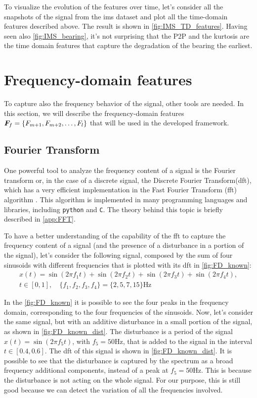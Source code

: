 To visualize the evolution of the features over time, let's consider all the snapshots of the  signal from the \gls{ims} dataset and plot all the time-domain features described above. The result is shown in \autoref{fig:IMS_TD_features}. Having seen also \autoref{fig:IMS_bearing}, it's not surprising that the P2P and the kurtosis are the time domain features that capture the degradation of the bearing the earliest. 


\section{Frequency-domain features}

To capture also the frequency behavior of the signal, other tools are needed. In this section, we will describe the frequency-domain features  $\bm{F}_f = \{F_{m+1}, F_{m+2}, \dots, F_l\}$ that will be used in the developed framework.

\subsection{Fourier Transform}
\label{sec:FFT}

One powerful tool to analyze the frequency content of a signal is the Fourier transform or, in the case of a discrete signal, the Discrete Fourier Transform(\gls{dft}), which has a very efficient implementation in the Fast Fourier Transform (\gls{fft}) algorithm \cite{cooley1965algorithm}. This algorithm is implemented in many programming languages and libraries, including \texttt{python} and \texttt{C}. The theory behind this topic is briefly described in \autoref{app:FFT}. 

To have a better understanding of the capability of the \gls{fft} to capture the frequency content of a signal (and the presence of a disturbance in a portion of the signal), let's consider the following signal, composed by the sum of four sinusoids with different frequencies that is plotted with its \gls{dft} in \autoref{fig:FD_known}:
\begin{multline}
    x(t) = \sin(2\pi f_1 t) + \sin(2\pi f_2 t) + \sin(2\pi f_3 t) + \sin(2\pi f_4 t), \\
    t \in [0, 1], \quad \{f_1, f_2, f_3, f_4\} = \{2, 5, 7, 15\} \si{\Hz}
\end{multline}

In the \autoref{fig:FD_known} it is possible to see the four peaks in the frequency domain, corresponding to the four frequencies of the sinusoids. Now, let's consider the same signal, but with an additive disturbance in a small portion of the signal, as shown in \autoref{fig:FD_known_dist}. The disturbance is a period of the signal $x(t) = \sin(2\pi f_5 t)$, with $f_5=50\si{\Hz}$, that is added to the signal in the interval $t \in [0.4, 0.6]$. The \gls{dft} of this signal is shown in \autoref{fig:FD_known_dist}. It is possible to see that the disturbance is captured by the spectrum as a broad frequency additional components, instead of a peak at $f_5=50\si{\Hz}$. This is because the disturbance is not acting on the whole signal. For our purpose, this is still good because we can detect the variation of all the frequencies involved.

